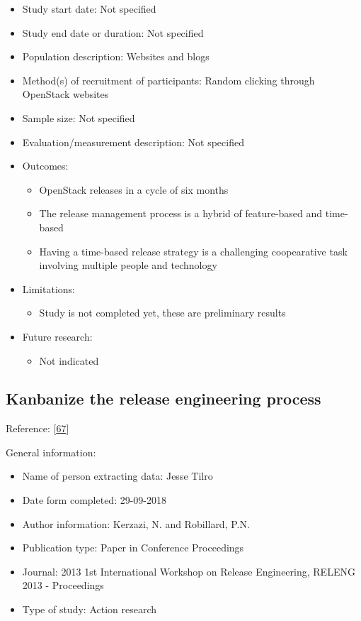 \documentclass[]{book}
\providecommand{\tightlist}{%
  \setlength{\itemsep}{0pt}\setlength{\parskip}{0pt}}
\begin{document}
\begin{itemize}
\tightlist
\item
  Study start date: Not specified
\item
  Study end date or duration: Not specified
\item
  Population description: Websites and blogs
\item
  Method(s) of recruitment of participants: Random clicking through
  OpenStack websites
\item
  Sample size: Not specified
\item
  Evaluation/measurement description: Not specified
\item
  Outcomes:

  \begin{itemize}
  \tightlist
  \item
    OpenStack releases in a cycle of six months
  \item
    The release management process is a hybrid of feature-based and
    time-based
  \item
    Having a time-based release strategy is a challenging coopearative
    task involving multiple people and technology
  \end{itemize}
\item
  Limitations:

  \begin{itemize}
  \tightlist
  \item
    Study is not completed yet, these are preliminary results
  \end{itemize}
\item
  Future research:

  \begin{itemize}
  \tightlist
  \item
    Not indicated
  \end{itemize}
\end{itemize}

\subsection{Kanbanize the release engineering
process}\label{kanbanize-the-release-engineering-process}

Reference: {[}\protect\hyperlink{ref-kerzazi2013a}{67}{]}

General information:

\begin{itemize}
\tightlist
\item
  Name of person extracting data: Jesse Tilro
\item
  Date form completed: 29-09-2018
\item
  Author information: Kerzazi, N. and Robillard, P.N.
\item
  Publication type: Paper in Conference Proceedings
\item
  Journal: 2013 1st International Workshop on Release Engineering,
  RELENG 2013 - Proceedings
\item
  Type of study: Action research
\end{itemize}
\end{document}
